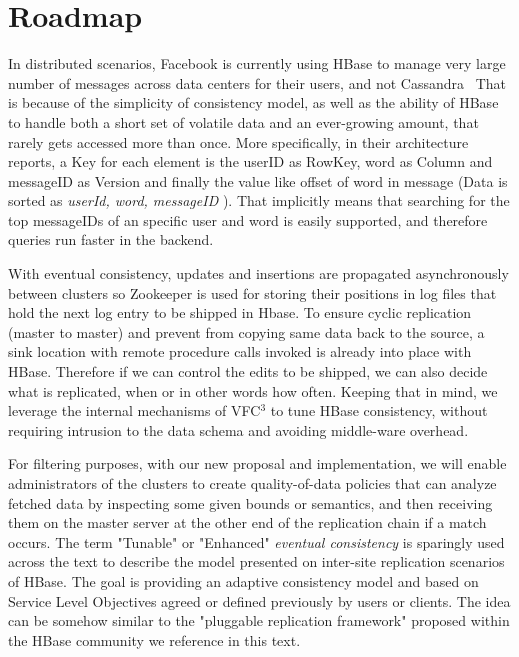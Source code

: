 \section{Roadmap}\label{roadmap}
In distributed scenarios, Facebook is currently using HBase to manage very large number of messages across data centers for their users, and not Cassandra~\cite{FacebookHBase} That is because of the simplicity of consistency model, as well as the ability of HBase to handle both a short set of volatile data and an ever-growing amount, that rarely gets accessed more than once. More specifically, in their architecture reports, a Key for each element is the userID as RowKey, word as Column and messageID as Version and finally the value like offset of word in message (Data is sorted as \emph{userId, word, messageID} ). That implicitly means that searching for the top messageIDs of an specific user and word is easily supported, and therefore queries run faster in the backend.

With eventual consistency, updates and insertions are propagated asynchronously between clusters so Zookeeper is used for storing their positions in log files that hold the next log entry to be shipped in Hbase. To ensure cyclic replication (master to master) and prevent from copying same data back to the source, a sink location with remote procedure calls invoked is already into place with HBase. Therefore if we can control the edits to be shipped, we can also decide what is replicated, when or in other words how often. Keeping that in mind, we leverage the internal mechanisms of VFC$^{3}$ to tune HBase consistency, without requiring intrusion to the data schema and avoiding middle-ware overhead.

For filtering purposes, with our new proposal and implementation, we will enable administrators of the clusters to create quality-of-data policies that can analyze fetched data by inspecting some given bounds or semantics, and then receiving them on the master server at the other end of the replication chain if a match occurs. The term "Tunable" or "Enhanced" \emph{eventual consistency} is sparingly used across the text to describe the model presented on inter-site replication scenarios of HBase. The goal is providing an adaptive consistency model and based on Service Level Objectives agreed or defined previously by users or clients. The idea can be somehow similar to the "pluggable replication framework" proposed within the HBase community we reference in this text.



